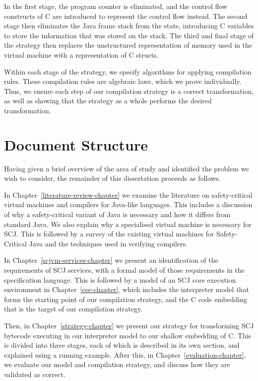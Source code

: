 In the first stage, the program counter is eliminated, and the control
flow constructs of C are introduced to represent the control flow
instead.
The second stage then eliminates the Java frame stack from the state,
introducing C variables to store the information that was stored on
the stack.
The third and final stage of the strategy then replaces the
unstructured representation of memory used in the virtual machine with
a representation of C structs.

Within each stage of the strategy, we specify algorithms for applying
compilation rules.
These compilation rules are algebraic laws, which we prove
individually.
Thus, we ensure each step of our compilation strategy is a correct
transformation, as well as showing that the strategy as a whole
performs the desired transformation.

\section{Document Structure}

Having given a brief overview of the area of study and identified the
problem we wish to consider, the remainder of this dissertation
proceeds as follows.

In Chapter~\ref{literature-review-chapter} we examine the literature
on safety-critical virtual machines and compilers for Java-like
languages.
This includes a discussion of why a safety-critical variant of Java is
necessary and how it differs from standard Java.
We also explain why a specialised virtual machine is necessary for
SCJ.
This is followed by a survey of the existing virtual machines for
Safety-Critical Java and the techniques used in verifying compilers.

In Chapter~\ref{scjvm-services-chapter} we present an identification
of the requirements of SCJ
services, with a formal model of those requirements in the \Circus{}
specification language.
This is followed by a model of an SCJ core execution environment in
Chapter~\ref{cee-chapter}, which includes the interpreter model that
forms the starting point of our compilation strategy, and the C code
embedding that is the target of our compilation strategy.

Then, in Chapter~\ref{strategy-chapter}\added{,} we present our
strategy for transforming SCJ bytecode executing in our interpreter
model to our shallow embedding of C.
This is divided into three stages, each of which is described in its
own section, and explained using a running example.
After this, in Chapter~\ref{evaluation-chapter}, we evaluate our model
and compilation strategy, and discuss how they are validated as
correct.


